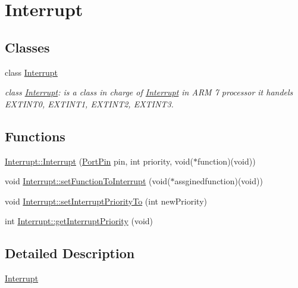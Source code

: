 \hypertarget{group__group10}{
\section{Interrupt}
\label{d4/dda/group__group10}
}
\subsection*{Classes}
\begin{DoxyCompactItemize}
\item 
class \hyperlink{class_interrupt}{Interrupt}
\begin{DoxyCompactList}\small\item\em class \hyperlink{class_interrupt}{Interrupt}: is a class in charge of \hyperlink{class_interrupt}{Interrupt} in ARM 7 processor it handels EXTINT0, EXTINT1, EXTINT2, EXTINT3. \end{DoxyCompactList}\end{DoxyCompactItemize}
\subsection*{Functions}
\begin{DoxyCompactItemize}
\item 
\hyperlink{group__group10_ga4fd8be38d92c8b0086b15b3c30ea1868}{Interrupt::Interrupt} (\hyperlink{class_port_pin}{PortPin} pin, int priority, void($\ast$function)(void))
\item 
void \hyperlink{group__group10_gafee631d8690407d619fe9ba2741b6c4d}{Interrupt::setFunctionToInterrupt} (void($\ast$assginedfunction)(void))
\item 
void \hyperlink{group__group10_ga4cd6bc79c3fa54378a156117de5f12a9}{Interrupt::setInterruptPriorityTo} (int newPriority)
\item 
int \hyperlink{group__group10_ga8d3124b3721e2426dc24fc8416f12e38}{Interrupt::getInterruptPriority} (void)
\end{DoxyCompactItemize}


\subsection{Detailed Description}
\hyperlink{class_interrupt}{Interrupt} 

